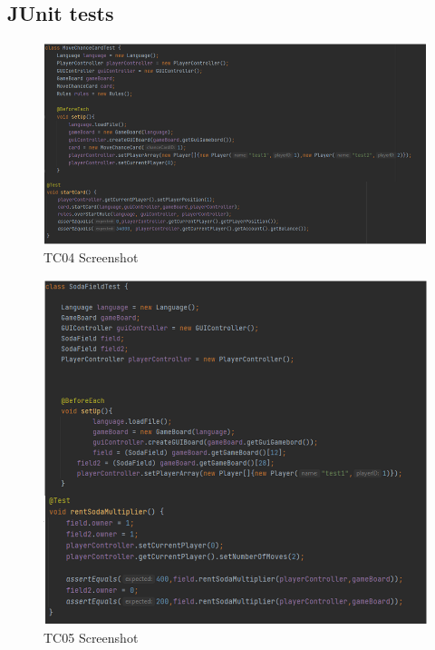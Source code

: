 \begin{flushleft}
\subsection{JUnit tests}
\begin{figure}[H] %
    \centering
    \includegraphics[width=16cm]{Report/figures/Unittests/BilagTC04.png}
    \caption{TC04 Screenshot}
    \label{TC04Bilag}
\end{figure}\begin{figure}[H] %
    \centering
    \includegraphics[width=16cm]{Report/figures/Unittests/BilagTC05.png}
    \caption{TC05 Screenshot}
    \label{TC05Bilag}
\end{figure}\begin{figure}[H] %

\end{figure}
\end{flushleft}
